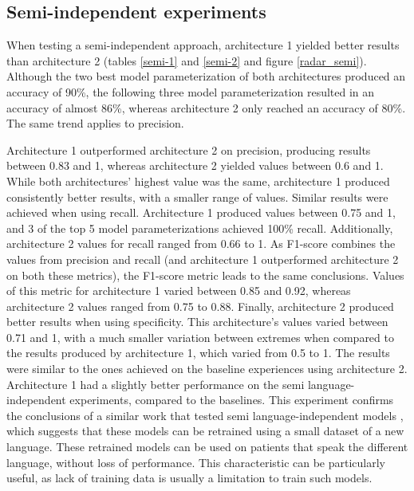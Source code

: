 \subsection{Semi-independent experiments}

When testing a semi-independent approach, architecture 1 yielded better results than architecture 2 (tables \ref{semi-1} and \ref{semi-2} and figure \ref{radar_semi}). Although the two best model parameterization of both architectures produced an accuracy of 90\%, the following three model parameterization resulted in an accuracy of almost 86\%, whereas architecture 2 only reached an accuracy of 80\%. The same trend applies to precision.

Architecture 1 outperformed architecture 2 on precision, producing results between 0.83 and 1, whereas architecture 2 yielded values between 0.6 and 1. While both architectures' highest value was the same, architecture 1 produced consistently better results, with a smaller range of values. Similar results were achieved when using recall. Architecture 1 produced values between 0.75 and 1, and 3 of the top 5 model parameterizations achieved 100\% recall. Additionally, architecture 2 values for recall ranged from 0.66 to 1. As F1-score combines the values from precision and recall (and architecture 1 outperformed architecture 2 on both these metrics), the F1-score metric leads to the same conclusions. Values of this metric for architecture 1 varied between 0.85 and 0.92, whereas architecture 2 values ranged from 0.75 to 0.88. Finally, architecture 2 produced better results when using specificity. This architecture's values varied between 0.71 and 1, with a much smaller variation between extremes when compared to the results produced by architecture 1, which varied from 0.5 to 1. The results were similar to the ones achieved on the baseline experiences using architecture 2. Architecture 1 had a slightly better performance on the semi language-independent experiments, compared to the baselines. This experiment confirms the conclusions of a similar work that tested semi language-independent models \cite{parkinson_three_languages}, which suggests that these models can be retrained using a small dataset of a new language. These retrained models can be used on patients that speak the different language, without loss of performance. This characteristic can be particularly useful, as lack of training data is usually a limitation to train such models.

